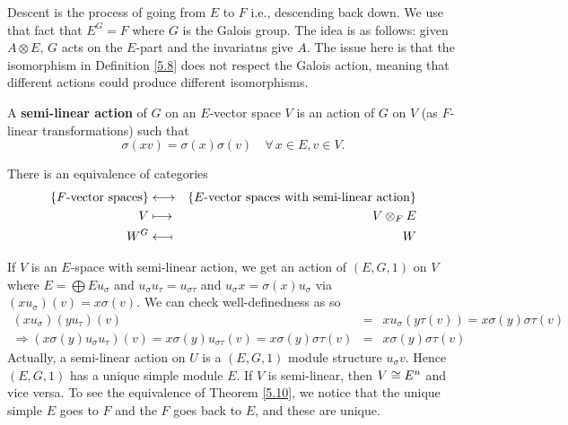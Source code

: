 Descent is the process of going from $E$ to $F$ i.e., descending back down. We use that fact that $E^G = F$ where $G$ is the Galois group. The idea is as follows: given $A \otimes E$, $G$ acts on the $E$-part and the invariatns give $A$. The issue here is that the isomorphism in Definition \ref{5.8} does not respect the Galois action, meaning that different actions could produce different isomorphisms. 



\begin{defn}\label{5.9}
A \textbf{semi-linear action} of $G$ on an $E$-vector space $V$ is an action of $G$ on $V$ (as $F$-linear transformations) such that 
\begin{equation}
\sigma (xv) = \sigma(x)\sigma(v) \quad \forall \,  x\in E,v\in V.
\end{equation}
\end{defn}


\begin{theorem}\label{5.10}
There is an equivalence of categories
\begin{eqnarray*}
\left\lbrace F\text{-vector spaces} \right\rbrace & \longleftrightarrow & \left\lbrace E\text{-vector spaces with semi-linear action} \right\rbrace \\
V & \longmapsto & V \otimes_F E \\
W^G & \longmapsfrom & W 
\end{eqnarray*}
\end{theorem}
If $V$ is an $E$-space with semi-linear action, we get an action of $(E,G,1)$ on $V$ where $E = \bigoplus Eu_{\sigma}$ and $u_{
\sigma}u_{\tau} = u_{\sigma\tau}$ and $u_{\sigma}x = \sigma (x)u_{\sigma}$ via $(xu_{\sigma})(v) = x\sigma (v)$. We can check well-definedness as so
\begin{eqnarray*}
(xu_{\sigma})(yu_{\tau})(v) & = & xu_{\sigma}(y\tau(v)) = x\sigma (y)\sigma\tau(v) \\
\Rightarrow (x\sigma (y)u_{\sigma}u_{\tau})(v) = x \sigma (y)u_{\sigma\tau}(v) = x\sigma (y)\sigma\tau(v) & = & x\sigma (y)\sigma\tau(v)
\end{eqnarray*}
Actually, a semi-linear action on $U$ is a $(E,G,1)$ module structure $u_{\sigma}v$. Hence $(E,G,1)$ has a unique simple module $E$. If $V$ is semi-linear, then $V \cong E^n$ and vice versa. To see the equivalence of Theorem \ref{5.10}, we notice that the unique simple $E$ goes to $F$ and the $F$ goes back to $E$, and these are unique. 



